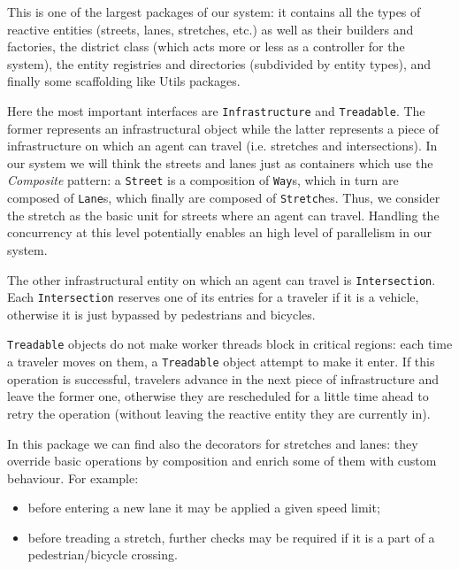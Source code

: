 This is one of the largest packages of our system: it contains all the types of
reactive entities (streets, lanes, stretches, etc.) as well as their builders
and factories, the district class (which acts more or less as a controller for
the system), the entity registries and directories (subdivided by entity types),
and finally some scaffolding like Utils packages.

Here the most important interfaces are \texttt{Infrastructure} and
\texttt{Treadable}. The former represents an infrastructural object while the
latter represents a piece of infrastructure on which an agent can travel
(i.e. stretches and intersections).
In our system we will think the streets and lanes just as containers
which use the
\textit{Composite} pattern: a \texttt{Street} is a composition of \texttt{Way}s,
which in turn are composed of \texttt{Lane}s, which finally are composed of
\texttt{Stretch}es.
Thus, we consider the stretch as the basic unit
for streets where an agent can travel.
Handling the concurrency at this level potentially enables
an high level of  parallelism in our system.

The other infrastructural entity on which an agent can travel is
\texttt{Intersection}. Each \texttt{Intersection} reserves one of its
entries for a traveler if it is a vehicle, otherwise it is just bypassed by
pedestrians and bicycles.

\texttt{Treadable} objects do not make worker threads block in critical regions:
each
time a traveler moves on them, a \texttt{Treadable} object attempt to make it
enter. If this
operation is successful, travelers advance in the next piece of infrastructure
and leave the former one, otherwise they are rescheduled for a little time ahead
to retry the operation (without leaving the reactive entity they are currently
in).

In this package we can find also the decorators for stretches and lanes: they
override basic operations by composition and enrich some of them with custom
behaviour. For example:

\begin{itemize}
  \item before entering a new lane it may be applied a given speed limit;
  \item before treading a stretch, further checks may be required if it is a
    part of a pedestrian/bicycle crossing.
 \end{itemize}
